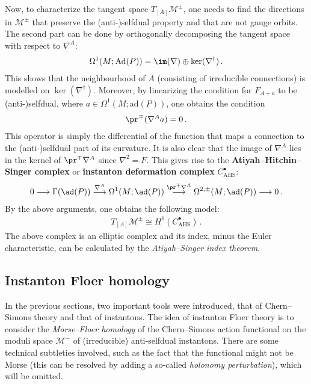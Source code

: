     Now, to characterize the tangent space $T_{[A]}\mathcal{M}^\pm$, one needs to find the directions in $\mathcal{M}^\pm$ that preserve the (anti-)selfdual property and that are not gauge orbits. The second part can be done by orthogonally decomposing the tangent space with respect to $\nabla^A$:
    \begin{gather}
        \Omega^1(M;\mathrm{Ad}(P))=\im(\nabla)\oplus\ker(\nabla^\dagger)\,.
    \end{gather}
    This shows that the neighbourhood of $A$ (consisting of irreducible connections) is modelled on $\ker(\nabla^\dagger)$. Moreover, by linearizing the condition for $F_{A+a}$ to be (anti-)selfdual, where $a\in\Omega^1(M;\mathrm{ad}(P))$, one obtains the condition
    \begin{gather}
        \pr^\mp(\nabla^Aa)=0\,.
    \end{gather}
    This operator is simply the differential of the function that maps a connection to the (anti-)selfdual part of its curvature. It is also clear that the image of $\nabla^A$ lies in the kernel of $\pr^\mp\nabla^A$ since $\nabla^2=F$. This gives rise to the \textbf{Atiyah--Hitchin--Singer complex} or \textbf{instanton deformation complex} $C^\bullet_{\text{AHS}}$:
    \begin{gather}
        0\longrightarrow\Gamma(\ad(P))\overset{\nabla^A}{\longrightarrow}\Omega^1(M;\ad(P))\overset{\pr^\mp\nabla^A}{\longrightarrow}\Omega^{2,\pm}(M;\ad(P))\longrightarrow0\,.
    \end{gather}
    By the above arguments, one obtains the following model:
    \begin{gather}
        T_{[A]}\mathcal{M}^\pm\cong H^1(C^\bullet_{\text{AHS}})\,.
    \end{gather}
    The above complex is an elliptic complex and its index, minus the Euler characteristic, can be calculated by the \textit{Atiyah--Singer index theorem}.


\subsection{Instanton Floer homology}

    In the previous sections, two important tools were introduced, that of Chern--Simons theory and that of instantons. The idea of instanton Floer theory is to consider the \textit{Morse--Floer homology} of the Chern--Simons action functional on the moduli space $\mathcal{M}^-$ of (irreducible) anti-selfdual instantons. There are some technical subtleties involved, such as the fact that the functional might not be Morse (this can be resolved by adding a so-called \textit{holonomy perturbation}), which will be omitted.

